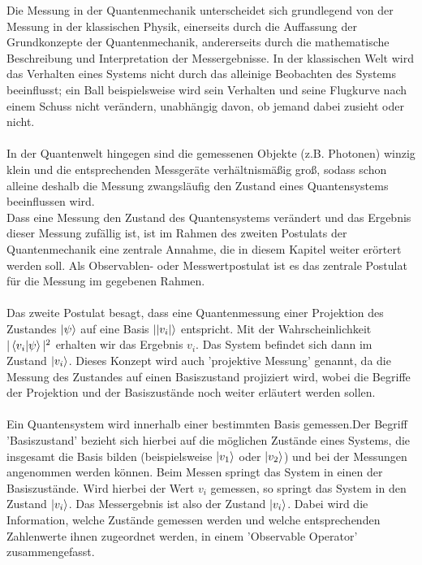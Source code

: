Die Messung in der Quantenmechanik unterscheidet sich grundlegend von der Messung in der klassischen Physik, einerseits durch die Auffassung der Grundkonzepte der Quantenmechanik, andererseits durch die mathematische Beschreibung und Interpretation der Messergebnisse.
In der klassischen Welt wird das Verhalten eines Systems nicht durch das alleinige Beobachten des Systems beeinflusst; ein Ball beispielsweise wird sein Verhalten und seine Flugkurve nach einem Schuss nicht verändern, unabhängig davon, ob jemand dabei zusieht oder nicht. \\
\\
In der Quantenwelt hingegen sind die gemessenen Objekte (z.B. Photonen) winzig klein und die entsprechenden Messgeräte verhältnismäßig groß, sodass schon alleine deshalb die Messung zwangsläufig den Zustand eines Quantensystems beeinflussen wird. \\
Dass eine Messung den Zustand des Quantensystems verändert und das Ergebnis dieser Messung zufällig ist, ist im Rahmen des zweiten Postulats der Quantenmechanik eine zentrale Annahme, die in diesem Kapitel weiter erörtert werden soll. Als Observablen- oder Messwertpostulat ist es das zentrale Postulat für die Messung im gegebenen Rahmen. \\
\\
Das zweite Postulat besagt, dass eine Quantenmessung einer Projektion des Zustandes $\ket{\psi}$ auf eine Basis $\ket{|v_i|}$ entspricht. Mit der Wahrscheinlichkeit $|\braket{v_i|\psi}|^2$ erhalten wir das Ergebnis $v_i$. Das System befindet sich dann im Zustand $\ket{v_i}$. \cite{lvovsky_quantum_2018} 
\newline Dieses Konzept wird auch 'projektive Messung' genannt, da die Messung des Zustandes auf einen Basiszustand projiziert wird, wobei die Begriffe der Projektion und der Basiszustände noch weiter erläutert werden sollen. \\
\\
Ein Quantensystem wird innerhalb einer bestimmten Basis gemessen.Der Begriff 'Basiszustand' bezieht sich hierbei auf die möglichen Zustände eines Systems, die insgesamt die Basis bilden (beispielsweise $\ket{v_1}$ oder $\ket{v_2}$) und bei der Messungen angenommen werden können.
Beim Messen springt das System in einen der Basiszustände. 
Wird hierbei der Wert $v_i$ gemessen, so springt das System in den Zustand $\ket{v_i}$. Das Messergebnis ist also der Zustand $\ket{v_i}$. 
Dabei wird die Information, welche Zustände gemessen werden und welche entsprechenden Zahlenwerte ihnen zugeordnet werden, in einem 'Observable Operator' zusammengefasst. \\
